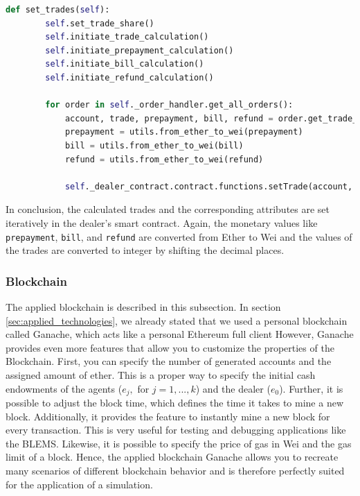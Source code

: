 \begin{lstlisting}[float=htbp, label=lst:offchain_set_trades, caption=Setting of Trades in Smart Contract Dealer, language=Python]
    def set_trades(self):
        self.set_trade_share()
        self.initiate_trade_calculation()
        self.initiate_prepayment_calculation()
        self.initiate_bill_calculation()
        self.initiate_refund_calculation()

        for order in self._order_handler.get_all_orders():
            account, trade, prepayment, bill, refund = order.get_trade_information()
            prepayment = utils.from_ether_to_wei(prepayment)
            bill = utils.from_ether_to_wei(bill)
            refund = utils.from_ether_to_wei(refund)

            self._dealer_contract.contract.functions.setTrade(account, trade, prepayment, bill, refund).transact({'from': self._account_address})
\end{lstlisting}

In conclusion, the calculated trades and the corresponding attributes are set iteratively in the dealer's smart contract. 
Again, the monetary values like \verb|prepayment|, \verb|bill|, and \verb|refund| are converted from Ether to Wei and 
the values of the trades are converted to integer by shifting the decimal places.

\subsubsection{Blockchain}
The applied blockchain is described in this subsection. In section \ref{sec:applied_technologies}, we already
stated that we used a personal blockchain called Ganache, which acts like a personal Ethereum full client  
However, Ganache provides even more features that allow you to customize the properties of the Blockchain.
First, you can specify the number of generated accounts and the assigned amount of ether.
This is a proper way to specify the initial cash endowments of the agents ($e_{j},$ for $j=1, ..., k$)
and the dealer ($e_{0}$).
Further, it is possible to adjust the block time, which defines the time it takes to mine a new block. 
Additionally, it provides the feature to instantly mine a new block for every transaction. 
This is very useful for testing and debugging applications like the BLEMS.
Likewise, it is possible to specify the price of gas in Wei and the gas limit of a block. 
Hence, the applied blockchain Ganache allows you to recreate many scenarios of different blockchain behavior
and is therefore perfectly suited for the application of a simulation.


